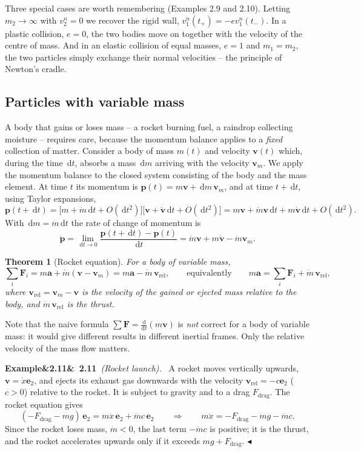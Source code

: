 \documentclass[11pt,a4paper,oneside]{report}
\numberwithin{equation}{chapter}
\newcommand{\vect}[1]{\bm{#1}}
\newcommand{\e}[1]{\vect{e}_{#1}}
\newcommand{\dd}{\,\mathrm{d}}
\theoremstyle{plain}
\newtheorem{theorem}{Theorem}[chapter]
\theoremstyle{definition}
\theoremstyle{remark}
\newenvironment{example}[2]{%
  \par\addvspace{\bigskipamount}\noindent
  \textbf{Example\ifx&#1&\else~#1\fi}\ \textit{(#2).}\ \ignorespaces}%
  {\hfill$\blacktriangleleft$\par\addvspace{\bigskipamount}}
\begin{document}
Three special cases are worth remembering (Examples 2.9 and 2.10). Letting $m_2\to\infty$ with $v_2^n=0$ we recover the
rigid wall, $v_1^n(t_+)=-ev_1^n(t_-)$. In a plastic collision, $e=0$, the two bodies move on together with the velocity
of the centre of mass. And in an elastic collision of equal masses, $e=1$ and $m_1=m_2$, the two particles simply
exchange their normal velocities -- the principle of Newton's cradle.

\subsection{Particles with variable mass}
A body that gains or loses mass -- a rocket burning fuel, a raindrop collecting moisture -- requires care, because the
momentum balance applies to a \emph{fixed} collection of matter. Consider a body of mass $m(t)$ and velocity $\vect v(t)$
which, during the time $\dd t$, absorbs a mass $\dd m$ arriving with the velocity $\vect v_m$. We apply the momentum
balance to the closed system consisting of the body and the mass element. At time $t$ its momentum is
$\vect p(t)=m\vect v+\dd m\,\vect v_m$, and at time $t+\dd t$, using Taylor expansions,
\[
  \vect p(t+\dd t)=\big[m+\dot m\dd t+O(\dd t^2)\big]\big[\vect v+\dot{\vect v}\dd t+O(\dd t^2)\big]
  =m\vect v+\dot m\vect v\dd t+m\dot{\vect v}\dd t+O(\dd t^2).
\]
With $\dd m=\dot m\dd t$ the rate of change of momentum is
\[
  \dot{\vect p}=\lim_{\dd t\to0}\frac{\vect p(t+\dd t)-\vect p(t)}{\dd t}=\dot m\vect v+m\dot{\vect v}-\dot m\vect v_m .
\]
\begin{theorem}[Rocket equation]
For a body of variable mass,
\begin{equation}
  \sum_i\vect F_i=m\vect a+\dot m(\vect v-\vect v_m)=m\vect a-\dot m\,\vect v_{\text{rel}},
  \qquad\text{equivalently}\qquad m\vect a=\sum_i\vect F_i+\dot m\,\vect v_{\text{rel}},
\end{equation}
where $\vect v_{\text{rel}}=\vect v_m-\vect v$ is the velocity of the gained or ejected mass relative to the body, and
$\dot m\,\vect v_{\text{rel}}$ is the \emph{thrust}.
\end{theorem}
Note that the naive formula $\sum\vect F=\frac{\mathrm d}{\mathrm dt}(m\vect v)$ is \emph{not} correct for a body of
variable mass: it would give different results in different inertial frames. Only the relative velocity of the mass
flow matters.

\begin{example}{2.11}{Rocket launch}
A rocket moves vertically upwards, $\vect v=\dot x\e2$, and ejects its exhaust gas downwards with the velocity
$\vect v_{\text{rel}}=-c\e2$ ($c>0$) relative to the rocket. It is subject to gravity and to a drag $F_{\text{drag}}$.
The rocket equation gives
\[
  (-F_{\text{drag}}-mg)\,\e2=m\ddot x\,\e2+\dot mc\,\e2\qquad\Longrightarrow\qquad m\ddot x=-F_{\text{drag}}-mg-\dot mc .
\]
Since the rocket loses mass, $\dot m<0$, the last term $-\dot mc$ is positive; it is the thrust, and the rocket
accelerates upwards only if it exceeds $mg+F_{\text{drag}}$.
\end{example}
\end{document}
